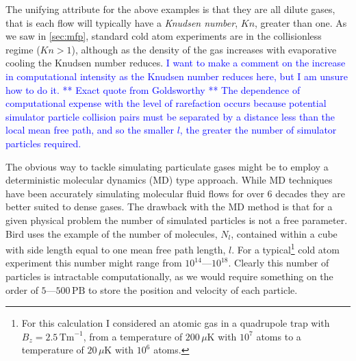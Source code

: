The unifying attribute for the above examples is that they are all dilute gases, that is each flow will typically have a \emph{Knudsen number}, $Kn$, greater than one.
As we saw in \autoref{sec:mfp}, standard cold atom experiments are in the collisionless regime ($Kn>1$), although as the density of the gas increases with evaporative cooling the Knudsen number reduces.
\textcolor{blue}{I want to make a comment on the increase in computational intensity as the Knudsen number reduces here, but I am unsure how to do it. ** Exact quote from Goldsworthy ** The dependence of computational expense with the level of rarefaction occurs because potential simulator particle collision pairs must be separated by a distance less than the local mean free path, and so the smaller $l$, the greater the number of simulator particles required. }

The obvious way to tackle simulating particulate gases might be to employ a deterministic molecular dynamics (MD) \cite{Alder1957} type approach.
While MD techniques have been accurately simulating molecular fluid flows for over 6 decades \cite{?,?,?} they are better suited to dense gases.
The drawback with the MD method is that for a given physical problem the number of simulated particles is not a free parameter.
Bird uses the example of the number of molecules, $N_l$, contained within a cube with side length equal to one mean free path length, $l$.
For a typical\footnote{For this calculation I considered an atomic gas in a quadrupole trap with $B_z=2.5\,\mathrm{Tm}^{-1}$, from a temperature of $200\,\mu\mathrm{K}$ with $10^7$ atoms to a temperature of $20\,\mu\mathrm{K}$ with $10^6$ atoms.} cold atom experiment this number might range from $10^{14}$---$10^{18}$.
Clearly this number of particles is intractable computationally, as we would require something on the order of $5$---$500\,\mathrm{PB}$ to store the position and velocity of each particle.

